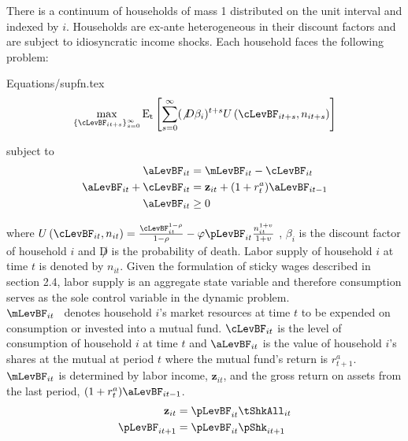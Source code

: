 \documentclass[titlepage]{\econtex}\providecommand{\texname}{BufferStockTheory}
\providecommand{\EqDir}{Equations}
\begin{document}
There is a continuum of households of mass 1 distributed on the unit
interval and indexed by $i$. Households are ex-ante heterogeneous in their discount factors and are subject to idiosyncratic income shocks.  Each household faces the following problem:

\begin{verbatimwrite}{\EqDir/supfn.tex}
\begin{eqnarray}
  \label{eq:supfn}
  \max_{\{\cLevBF_{it+s}\}_{s=0}^{\infty}} \mathrm{E_{t}}\left[\sum_{s=0}^{\infty} (\not D \beta_{i})^{t+s} U\left(  \cLevBF_{i t+s}, n_{i t+s}\right)\right]
\end{eqnarray}
\end{verbatimwrite}
 

subject to 
\begin{align*}
\aLevBF_{it}     &= \mLevBF_{it} - \cLevBF_{it}   \label{eq:DBCparts} \\
\aLevBF_{it} +\cLevBF_{it}    &= \mathbf{z}_{it} +   (1 + r^{a}_{t} ) \aLevBF_{it-1}   \\ 
\aLevBF_{it}  &\geq 0 \\
\end{align*}

where
$U\left(\cLevBF_{i t}, n_{i t}\right) = \frac{\cLevBF_{i t}^{1-\rho}}{1 -\rho} - \varphi \pLevBF_{it} \frac{n_{it}^{1+v}}{1+v}$ , $\beta_{i}$ is the discount factor of household $i$ and $\not D$ is the probability of death. Labor supply of household $i$ at time $t$ is denoted by $n_{it}$.  Given the formulation of sticky wages described in section 2.4, labor supply is an aggregate state variable and therefore consumption serves as the sole control variable in the dynamic problem.  \\

$\mLevBF_{it}$ \ denotes household $i$'s market resources at time $t$ to be expended on consumption or invested into a mutual fund. $\cLevBF_{it}$ is the level of consumption of household $i$ at time $t$ and  $ \aLevBF_{it}$ is the value of household $i$'s shares at the mutual at period $t$ where the mutual fund's return is $r_{t+1}^{a}$.  $\mLevBF_{it}$ is determined by labor income,  $\mathbf{z}_{it}$, and the gross return on assets from the last period, $(1+r_{t}^{a}) \aLevBF_{it-1} $.  \\




\begin{align*}
\mathbf{z}_{it} &= \pLevBF_{it}\tShkAll_{it} \\
\pLevBF_{it+1} &=\pLevBF_{it} \pShk_{it+1} \\
\end{align*}
\end{document}
